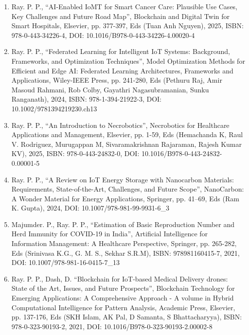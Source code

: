 \documentclass[11pt,a4paper]{moderncv}
\begin{document}
\begin{adjustwidth}{6em}{0pt}
	\begin{enumerate}
		
		\item Ray. P. P., “AI-Enabled IoMT for Smart Cancer Care: Plausible Use Cases, Key Challenges and Future Road Map”, Blockchain and Digital Twin for Smart Hospitals, Elsevier, pp. 377-397, Eds (Tuan Anh Nguyen), 2025, ISBN: 978-0-443-34226-4, DOI: 10.1016/B978-0-443-34226-4.00020-4
		
		\item Ray. P. P., “Federated Learning for Intelligent IoT Systems: Background, Frameworks, and Optimization Techniques”, Model Optimization Methods for Efficient and Edge AI: Federated Learning Architectures, Frameworks and Applications, Wiley-IEEE Press, pp. 241-280, Eds (Pethuru Raj, Amir Masoud Rahmani, Rob Colby, Gayathri Nagasubramanian, Sunku Ranganath), 2024, ISBN: 978-1-394-21922-3, DOI: 10.1002/9781394219230.ch13 
		
		\item Ray. P. P., “An Introduction to Necrobotics”, Necrobotics for Healthcare Applications and Management, Elsevier, pp. 1-59, Eds (Hemachanda K, Raul V. Rodriguez, Murugappan M, Sivaramakrishnan Rajaraman, Rajesh Kumar KV), 2025, ISBN: 978-0-443-24832-0, DOI: 10.1016/B978-0-443-24832-0.00001-5
		
		\item Ray. P. P., “A Review on IoT Energy Storage with Nanocarbon Materials: Requirements, State-of-the-Art, Challenges, and Future Scope”, NanoCarbon: A Wonder Material for Energy Applications, Springer, pp. 41–69, Eds (Ram K. Gupta), 2024, DOI: 10.1007/978-981-99-9931-6\_3
		
		\item Majumder. P., Ray. P. P., “Estimation of Basic Reproduction Number and Herd Immunity for COVID-19 in India”, Artificial Intelligence for Information Management: A Healthcare Perspective, Springer, pp. 265-282, Eds (Srinivasa K.G., G. M. S., Sekhar S.R.M), ISBN: 978981160415-7, 2021, DOI: 10.1007/978-981-16-0415-7\_13
		
		\item Ray. P. P., Dash, D. “Blockchain for IoT-based Medical Delivery drones: State of the Art, Issues, and Future Prospects”, Blockchain Technology for Emerging Applications: A Comprehensive Approach - A volume in Hybrid Computational Intelligence for Pattern Analysis, Academic Press, Elsevier, pp. 137-176, Eds (SKH Islam, AK Pal, D Samanta, S Bhattacharyya), ISBN:  978-0-323-90193-2, 2021, DOI: 10.1016/B978-0-323-90193-2.00002-8
		
		
	\end{enumerate}
\end{adjustwidth}
\end{document}
